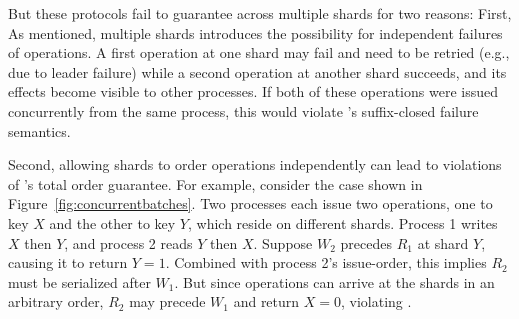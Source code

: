 But these protocols fail to 
guarantee \MDL{} across multiple shards for two reasons: First,
As mentioned, multiple shards
introduces the possibility for independent failures of operations. A first
operation at one shard may fail and need to be retried (e.g., due to
leader failure) while a second operation at another shard succeeds, and
its effects become visible to other processes. If both of these
operations were issued concurrently from the same process, 
this would violate \MDL{}'s suffix-closed failure semantics.

Second, allowing shards to order operations independently can lead to
violations of \MDL{}'s total order guarantee. For example, consider the
case shown in Figure~\ref{fig:concurrentbatches}. Two processes each issue two
operations, one to key $X$ and the other to key $Y$, which reside on different
shards. Process 1 writes $X$ then $Y$, and process 2 reads $Y$ then $X$. Suppose $W_2$ precedes $R_1$ at shard $Y$, causing it to return $Y=1$. Combined with
process 2's issue-order, this implies $R_2$ must be serialized after $W_1$.
But since operations can arrive at the shards in an arbitrary order, $R_2$ may
precede $W_1$ and return $X=0$, violating \MDL{}.

%